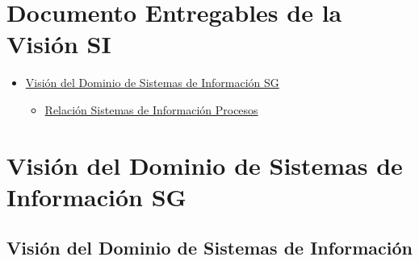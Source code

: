 \documentclass[
	a4paper, %
	12pt, %
]{include/CSSullivanBusinessReport}
\def\tightlist{}
\begin{document}
\newpage

\begin{twothirdswidth} %
	\tableofcontents %
\end{twothirdswidth}

\newpage


\section{Documento Entregables de la Visión
SI}\label{sec:documento-entregables-de-la-visiuxf3n-si}

\begin{itemize}
\tightlist
\item
  \hyperref[visiuxf3n-del-dominio-de-sistemas-de-informaciuxf3n-sg]{Visión
  del Dominio de Sistemas de Información SG}

  \begin{itemize}
  \tightlist
  \item
    \hyperref[relaciuxf3n-sistemas-de-informaciuxf3n-procesos]{Relación
    Sistemas de Información Procesos}
  \end{itemize}
\end{itemize}

\newpage

\section{Visión del Dominio de Sistemas de Información
SG}\label{sec:visiuxf3n-del-dominio-de-sistemas-de-informaciuxf3n-sg}

\subsection{Visión del Dominio de Sistemas de
Información}\label{sec:visiuxf3n-del-dominio-de-sistemas-de-informaciuxf3n}

\begin{quote}
\end{quote}
\end{document}
